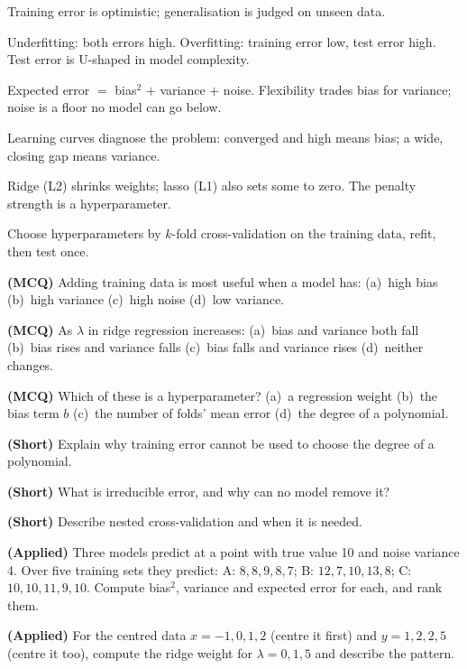 \begin{chaptersummary}
\begin{tight}
  \item Training error is optimistic; generalisation is judged on unseen data.
  \item Underfitting: both errors high. Overfitting: training error low, test
        error high. Test error is U-shaped in model complexity.
  \item Expected error $=$ bias$^2$ $+$ variance $+$ noise. Flexibility trades bias
        for variance; noise is a floor no model can go below.
  \item Learning curves diagnose the problem: converged and high means bias; a
        wide, closing gap means variance.
  \item Ridge (L2) shrinks weights; lasso (L1) also sets some to zero. The
        penalty strength is a hyperparameter.
  \item Choose hyperparameters by $k$-fold cross-validation on the training
        data, refit, then test once.
\end{tight}
\end{chaptersummary}

\begin{reviewq}
  \item \textbf{(MCQ)} Adding training data is most useful when a model has:
        (a)~high bias (b)~high variance (c)~high noise (d)~low variance.
  \item \textbf{(MCQ)} As $\lambda$ in ridge regression increases: (a)~bias and
        variance both fall (b)~bias rises and variance falls (c)~bias falls and
        variance rises (d)~neither changes.
  \item \textbf{(MCQ)} Which of these is a hyperparameter? (a)~a regression
        weight (b)~the bias term $b$ (c)~the number of folds' mean error
        (d)~the degree of a polynomial.
  \item \textbf{(Short)} Explain why training error cannot be used to choose the
        degree of a polynomial.
  \item \textbf{(Short)} What is irreducible error, and why can no model remove
        it?
  \item \textbf{(Short)} Describe nested cross-validation and when it is needed.
  \item \textbf{(Applied)} Three models predict at a point with true value 10 and
        noise variance 4. Over five training sets they predict: A: $8, 8, 9, 8, 7$;
        B: $12, 7, 10, 13, 8$; C: $10, 10, 11, 9, 10$. Compute bias$^2$, variance and
        expected error for each, and rank them.
  \item \textbf{(Applied)} For the centred data $x = -1, 0, 1, 2$ (centre it first)
        and $y = 1, 2, 2, 5$ (centre it too), compute the ridge weight for
        $\lambda = 0, 1, 5$ and describe the pattern.
\end{reviewq}
